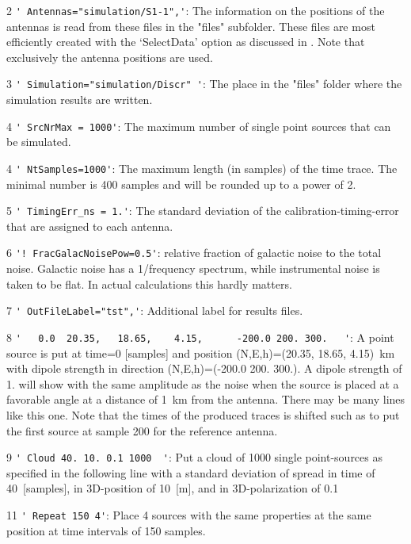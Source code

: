 \begin{enumerate*}
\item[2] \verb#' Antennas="simulation/S1-1",'#: The information on the positions of the antennas is read from these files in the "files" subfolder. These files are most efficiently created with the `SelectData' option as discussed in . Note that exclusively the antenna positions are used.
\item[3] \verb#' Simulation="simulation/Discr" '#:  The place in the "files" folder where the simulation results are written.
\item[4] \verb#' SrcNrMax = 1000'#:  The maximum number of single point sources that can be simulated.
\item[4] \verb#' NtSamples=1000'#:  The maximum length (in samples) of the time trace. The minimal number is 400 samples and will be rounded up to a power of 2.
\item[5] \verb#' TimingErr_ns = 1.'#:  The standard deviation of the calibration-timing-error that are assigned to each antenna.
\item[6] \verb#'! FracGalacNoisePow=0.5'#: relative fraction of galactic noise to the total noise. Galactic noise has a 1/frequency spectrum, while instrumental noise is taken to be flat. In actual calculations this hardly matters.
\item[7] \verb#' OutFileLabel="tst",'#:  Additional label for results files.
\item[8] \verb#'   0.0  20.35,   18.65,    4.15,      -200.0 200. 300.   '#:  A point source is put at time=0 [samples] and position (N,E,h)=(20.35, 18.65, 4.15)~km with dipole strength in direction (N,E,h)=(-200.0 200. 300.). A dipole strength of 1. will show with the same amplitude as the noise when the source is placed at a favorable angle at a distance of 1~km from the antenna. There may be many lines like this one. Note that the times of the produced traces is shifted such as to put the first source at sample 200 for the reference antenna.
\item[9] \verb#' Cloud 40. 10. 0.1 1000  '#: Put a cloud of 1000 single point-sources as specified in the following line with a standard deviation of spread in time of 40~[samples], in 3D-position of 10~[m], and in 3D-polarization of 0.1
\item[11] \verb#' Repeat 150 4'#:  Place 4 sources with the same properties at the same position at time intervals of 150 samples.
\end{enumerate*}

